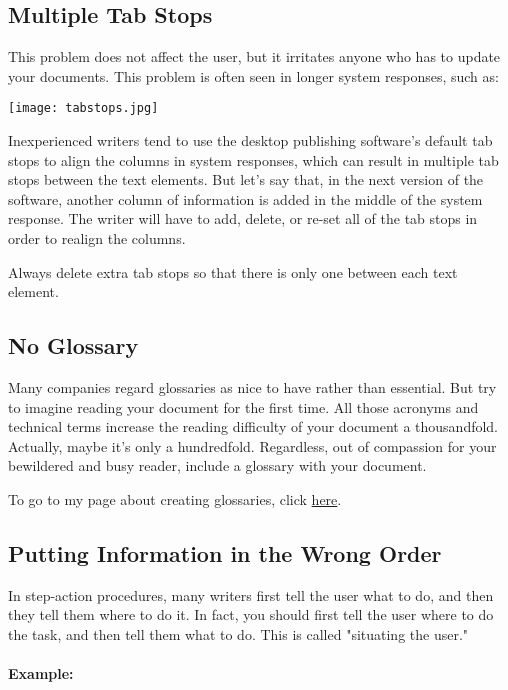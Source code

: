 \documentclass[12pt]{article}
\begin{document}
\subsection{Multiple Tab Stops}
This problem does not affect the user, but it irritates anyone who has to update your documents. This problem is often seen in longer system responses, such as: 

\begin{center} \texttt{[image: tabstops.jpg]} \end{center}

Inexperienced writers tend to use the desktop publishing software's default tab stops to align the columns in system responses, which can result in multiple tab stops between the text elements. But let's say that, in the next version of the software, another column of information is added in the middle of the system response. The writer will have to add, delete, or re-set all of the tab stops in order to realign the columns.

Always delete extra tab stops so that there is only one between each text element.

\subsection{No Glossary}
Many companies regard glossaries as nice to have rather than essential. But try to imagine reading your document for the first time. All those acronyms and technical terms increase the reading difficulty of your document a thousandfold. Actually, maybe it's only a hundredfold. Regardless, out of compassion for your bewildered and busy reader, include a glossary with your document.

To go to my page about creating glossaries, click \href{glossaries.html}{here}.

\subsection{Putting Information in the Wrong Order}
In step-action procedures, many writers first tell the user what to do, and then they tell them where to do it. In fact, you should first tell the user where to do the task, and then tell them what to do. This is called "situating the user."

\paragraph{Example:}
\end{document}
